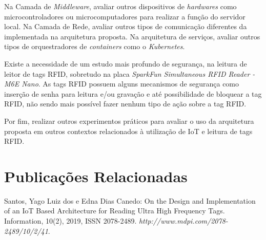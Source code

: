 Na Camada de \textit{Middleware}, avaliar outros dispositivos de \textit{hardwares} como microcontroladores ou microcomputadores para realizar a função do servidor local. Na Camada de Rede, avaliar outros tipos de comunicação diferentes da implementada na arquitetura proposta. Na arquitetura de serviços, avaliar outros tipos de orquestradores de \textit{containers} como o \textit{Kubernetes}.

Existe a necessidade de um estudo mais profundo de segurança, na leitura de leitor de tags \acrshort{RFID}, sobretudo na placa \textit{SparkFun Simultaneous RFID Reader - M6E Nano}. As tags \acrshort{RFID} possuem alguns mecanismos de segurança como inserção de senha para leitura e/ou gravação e até possibilidade de bloquear a tag \acrshort{RFID}, não sendo mais possível fazer nenhum tipo de ação sobre a tag \acrshort{RFID}.

Por fim, realizar outros experimentos práticos para avaliar o uso da arquitetura proposta em outros contextos relacionados à utilização de \acrshort{IoT} e leitura de tags \acrshort{RFID}.

\section{Publicações Relacionadas}

Santos, Yago Luiz dos e Edna Dias Canedo: On the Design and Implementation of an IoT Based Architecture for Reading Ultra High Frequency Tags. Information, 10(2), 2019, ISSN 2078-2489. \textit{http://www.mdpi.com/2078-2489/10/2/41}.